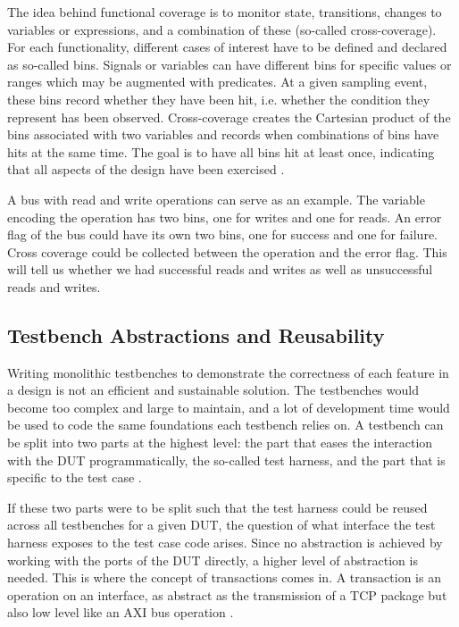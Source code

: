 The idea behind functional coverage is to monitor state, transitions, changes to variables or expressions, and a
combination of these (so-called cross-coverage). For each functionality, different cases of interest have to be
defined and declared as so-called bins. Signals or variables can have different bins for specific values or ranges
which may be augmented with predicates. At a given sampling event, these bins record whether they have been hit, i.e.
whether the condition they represent has been observed. Cross-coverage creates the Cartesian product of the bins
associated with two variables and records when combinations of bins have hits at the same time. The goal is to have
all bins hit at least once, indicating
that all aspects of the design have been exercised \cite[Sec. 7.6]{flake2020a}.

A bus with read and write operations can serve as an example. The variable encoding the operation has two bins, one for writes and one for reads. An error flag of the bus could have its own two bins, one for success and one for failure. Cross coverage could be collected between the operation and the error flag. This will tell us whether we had successful reads and writes as well as unsuccessful reads and writes.

\subsection{Testbench Abstractions and Reusability} %

Writing monolithic testbenches to demonstrate the correctness of each feature
in a design is not an efficient and sustainable solution. The testbenches would become too complex and large to
maintain, and a lot of development time would be
used to code the same foundations each testbench relies on. A testbench can be split into two parts at the highest
level: the part that eases the interaction with the DUT programmatically, the so-called test harness, and the part
that is specific to the test case \cite[Ch. 6]{bergeron2012writing}.

If these two parts were to be split such that the test harness could be reused across all testbenches for a given
DUT, the question of what interface the test harness exposes to the test case code arises. Since no abstraction is
achieved by working with the ports of the DUT directly, a higher level of abstraction is needed. This is where the
concept of transactions comes in. A transaction is an operation on an interface, as abstract as the transmission of a
TCP package but also low level like an AXI bus operation \cite[Ch. 1]{bergeron2005verification}.

